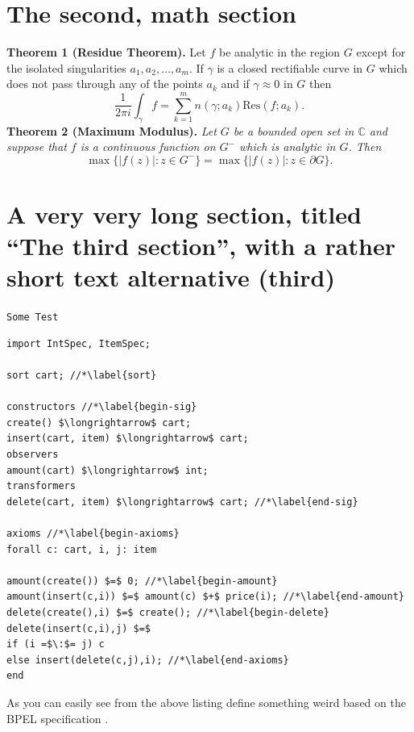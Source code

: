 \documentclass[12pt,mscthesis]{usiinfthesis}
\begin{document}
 \section{The second, math section}

\textbf{Theorem 1 (Residue Theorem).}
Let $f$ be analytic in the region $G$ except for the isolated singularities $a_1,a_2,\ldots,a_m$. If $\gamma$ is a closed rectifiable curve in $G$ which does not pass through any of the points $a_k$ and if $\gamma\approx 0$ in $G$ then
\[
\frac{1}{2\pi i}\int_\gamma f = \sum_{k=1}^m n(\gamma;a_k) \text{Res}(f;a_k).
\]
\textbf{Theorem 2 (Maximum Modulus).}
\emph{Let $G$ be a bounded open set in $\mathbb{C}$ and suppose that $f$ is a continuous function on $G^-$ which is analytic in $G$. Then}
\[
\max\{|f(z)|:z\in G^-\}=\max \{|f(z)|:z\in \partial G \}.
\]

\section[third]{A very very long section, titled ``The third section'', with
  a rather  short text alternative (third)}
\lipsum \texttt{Some Test}
\begin{lstlisting}
import IntSpec, ItemSpec;

sort cart; //*\label{sort}

constructors //*\label{begin-sig}
create() $\longrightarrow$ cart;
insert(cart, item) $\longrightarrow$ cart;
observers
amount(cart) $\longrightarrow$ int;
transformers
delete(cart, item) $\longrightarrow$ cart; //*\label{end-sig}

axioms //*\label{begin-axioms}
forall c: cart, i, j: item 

amount(create()) $=$ 0; //*\label{begin-amount}
amount(insert(c,i)) $=$ amount(c) $+$ price(i); //*\label{end-amount}
delete(create(),i) $=$ create(); //*\label{begin-delete}
delete(insert(c,i),j) $=$
if (i =$\:$= j) c
else insert(delete(c,j),i); //*\label{end-axioms}
end
\end{lstlisting}

As you can easily see from the above listing \citet{bbggs:iet07}
define something weird based on the BPEL specification
\citep{bpelspec}.

\nocite{*}

\appendix %
\end{document}
